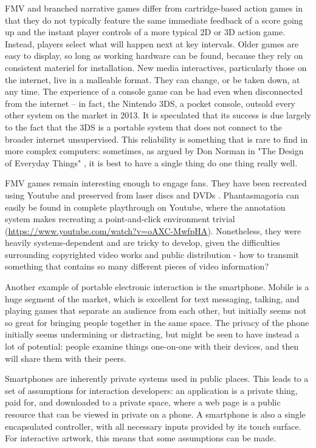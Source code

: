 FMV and branched narrative games differ from cartridge-based action games in that they do not typically feature the same immediate feedback of a score going up and the instant player controls of a more typical 2D or 3D action game. Instead, players select what will happen next at key intervals. Older games are easy to display, so long as working hardware can be found, because they rely on consistent materiel for installation. New media interactives, particularly those on the internet, live in a malleable format. They can change, or be taken down, at any time. The experience of a console game can be had even when disconnected from the internet – in fact, the Nintendo 3DS, a pocket console, outsold every other system on the market in 2013. It is speculated that its success is due largely to the fact that the 3DS is a portable system that does not connect to the broader internet unsupervised. This reliability is something that is rare to find in more complex computers: sometimes, as argued by Don Norman in "The Design of Everyday Things" \parencite{norman}, it is best to have a single thing do one thing really well. 

FMV games remain interesting enough to engage fans. They have been recreated using Youtube and preserved from laser discs and DVDs \parencite{laserdiscarcade}. Phantasmagoria can easily be found in complete playthrough on Youtube, where the annotation system makes recreating a point-and-click environment trivial (\url{https://www.youtube.com/watch?v=oAXC-MwfpHA}). Nonetheless, they were heavily systems-dependent and are tricky to develop, given the difficulties surrounding copyrighted video works and public distribution - how to transmit something that contains so many different pieces of video information?

Another example of portable electronic interaction is the smartphone. Mobile is a huge segment of the market, which is excellent for text messaging, talking, and playing games that separate an audience from each other, but initially seems not so great for bringing people together in the same space. The privacy of the phone initially seems undermining or distracting, but might be seen to have instead a lot of potential: people examine things one-on-one with their devices, and then will share them with their peers.

Smartphones are inherently private systems used in public places. This leads to a set of assumptions for interaction developers: an application is a private thing, paid for, and downloaded to a private space, where a web page is a public resource that can be viewed in private on a phone. A smartphone is also a single encapsulated controller, with all necessary inputs provided by its touch surface. For interactive artwork, this means that some assumptions can be made.

